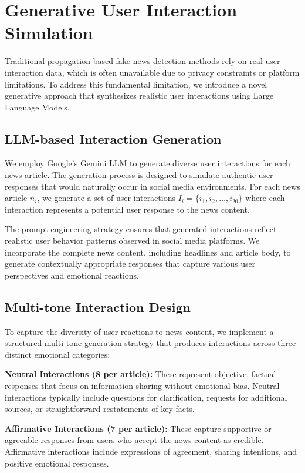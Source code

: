 \section{Generative User Interaction Simulation}

Traditional propagation-based fake news detection methods rely on real user interaction data, which is often unavailable due to privacy constraints or platform limitations. To address this fundamental limitation, we introduce a novel generative approach that synthesizes realistic user interactions using Large Language Models.

\subsection{LLM-based Interaction Generation}

We employ Google's Gemini LLM to generate diverse user interactions for each news article. The generation process is designed to simulate authentic user responses that would naturally occur in social media environments. For each news article $n_i$, we generate a set of user interactions $I_i = \{i_1, i_2, \ldots, i_{20}\}$ where each interaction represents a potential user response to the news content.

The prompt engineering strategy ensures that generated interactions reflect realistic user behavior patterns observed in social media platforms. We incorporate the complete news content, including headlines and article body, to generate contextually appropriate responses that capture various user perspectives and emotional reactions.

\subsection{Multi-tone Interaction Design}

To capture the diversity of user reactions to news content, we implement a structured multi-tone generation strategy that produces interactions across three distinct emotional categories:

\textbf{Neutral Interactions (8 per article):} These represent objective, factual responses that focus on information sharing without emotional bias. Neutral interactions typically include questions for clarification, requests for additional sources, or straightforward restatements of key facts.

\textbf{Affirmative Interactions (7 per article):} These capture supportive or agreeable responses from users who accept the news content as credible. Affirmative interactions include expressions of agreement, sharing intentions, and positive emotional responses.

